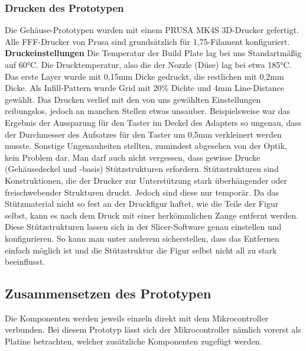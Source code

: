 \documentclass[11pt, twoside]{article}
\begin{document}
\subsubsection{Drucken des Prototypen}
Die Gehäuse-Prototypen wurden mit einem \glqq PRUSA MK4S\grqq{} 3D-Drucker gefertigt. Alle FFF-Drucker von Prusa sind grundsätzlich für 1,75-Filament konfiguriert.
\vspace{4mm}\newline
\textbf{Druckeinstellungen} \newline
Die Temperatur der Build Plate lag bei uns Standartmäßig auf 60°C. Die Drucktemperatur, also die der Nozzle (Düse) lag bei etwa 185°C. \newline
Das erste Layer wurde mit 0,15mm Dicke gedruckt, die restlichen mit 0,2mm Dicke. \newline
Als Infill-Pattern wurde \glqq Grid\grqq{} mit 20\% Dichte und 4mm Line-Distance gewählt. \newline
Das Drucken verlief mit den von uns gewählten Einstellungen reibungslos, jedoch an manchen Stellen etwas unsauber. Beispielsweise war das Ergebnis der Aussparung für den Taster im Deckel des Adapters so ungenau, dass der Durchmesser des Aufsatzes für den Taster um 0,5mm verkleinert werden musste. Sonstige Ungenauheiten stellten, zumindest abgesehen von der Optik, kein Problem dar. \newline
Man darf auch nicht vergessen, dass gewisse Drucke (Gehäusedeckel und -basis) Stützstrukturen erfordern. Stützstrukturen sind Konstruktionen, die der Drucker zur Unterstützung stark überhängender oder freischwebender Strukturen druckt. Jedoch sind diese nur temporär. Da das Stützmaterial nicht so fest an der Druckfigur haftet, wie die Teile der Figur selbst, kann es nach dem Druck mit einer herkömmlichen Zange entfernt werden. Diese Stützstrukturen lassen sich in der Slicer-Software genau einstellen und konfigurieren. So kann man unter anderem sicherstellen, dass das Entfernen einfach möglich ist und die Stützstruktur die Figur selbst nicht all zu stark beeinflusst.
\vspace{4mm}\newline
\parencite[vgl.][]{noauthor_urlnl16_nodate}
\subsection{Zusammensetzen des Prototypen}
Die Komponenten werden jeweils einzeln direkt mit dem Mikrocontroller verbunden. Bei diesem Prototyp lässt sich der Mikrocontroller nämlich vorerst als Platine betrachten, welcher zusätzliche Komponenten zugefügt werden.
\end{document}
